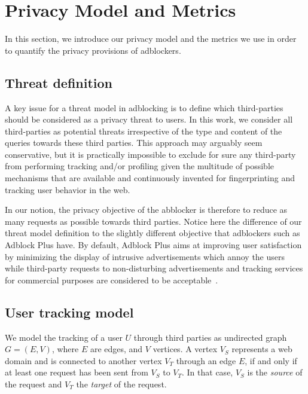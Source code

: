 \documentclass[compsoc, conference, letterpaper, 10pt, times]{IEEEtran}
\begin{document}
\section{Privacy Model and Metrics}
\label{sec:privacy_metrics}
In this section, we introduce our privacy model and the  metrics we use in order to quantify the privacy provisions of adblockers.

\subsection{Threat definition}
A key issue for a threat model in adblocking is to define which third-parties should be considered as a privacy threat to users. In this work, we consider all third-parties as potential threats irrespective of the type and content of the queries towards these third parties. This approach may arguably seem conservative, but it is practically impossible to exclude for sure any third-party from performing tracking and/or profiling given the multitude of possible mechanisms that are available and continuously invented for fingerprinting and tracking user behavior in the web.

In our notion, the privacy objective of the abblocker is therefore to reduce as many requests as possible towards third parties. Notice here the difference of our threat model definition to the slightly different objective that adblockers such as Adblock Plus have. By default, Adblock Plus aims at improving user satisfaction by minimizing the display of intrusive advertisements which annoy the users while third-party requests to non-disturbing advertisements and tracking services for commercial purposes are considered to be acceptable~\cite{acceptable_ads}.


\subsection{User tracking model}
\label{sec:graph_definition}
We model the tracking of a user $U$ through third parties as undirected graph $G=(E,V)$, where $E$ are edges, and $V$ vertices. A vertex $V_S$ represents a web domain and is connected to another vertex $V_T$ through an edge $E$, if and only if at least one request has been sent from $V_S$ to $V_T$. In that case, $V_S$ is the \textit{source} of the request and $V_T$ the \textit{target} of the request.
\end{document}
